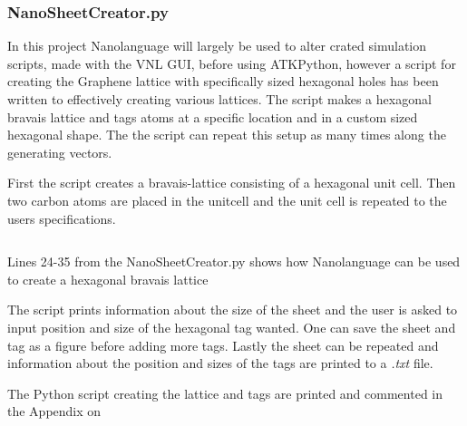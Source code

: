 \subsubsection{NanoSheetCreator.py}
In this project Nanolanguage will largely be used to alter crated simulation scripts, made with the VNL GUI, before using ATKPython, however a script for creating the Graphene lattice with specifically sized hexagonal holes has been written to effectively creating various lattices. The script makes a hexagonal bravais lattice and tags atoms at a specific location and in a custom sized hexagonal shape. The the script can repeat this setup as many times along the generating vectors.

First the script creates a bravais-lattice consisting of a hexagonal unit cell. Then two carbon atoms are placed in the unitcell and the unit cell is repeated to the users specifications.
\onecolumngrid


\begin{listing}
    \inputminted[python3=true,bgcolor=Black,linenos=true,firstline=24,lastline=35]{python}{VNL/PythonScripts/NanoSheetCreator.py}
    \caption{Lines 24-35 from the NanoSheetCreator.py shows how    Nanolanguage can be used to create a hexagonal bravais lattice}
    \label{listing1}
\end{listing}
\twocolumngrid
The script prints information about the size of the sheet and the user is asked to input position and size of the hexagonal tag wanted. One can save the sheet and tag as a figure before adding more tags. Lastly the sheet can be repeated and information about the position and sizes of the tags are printed to a \textit{.txt} file.

The Python script creating the lattice and tags are printed and commented in the Appendix on 
